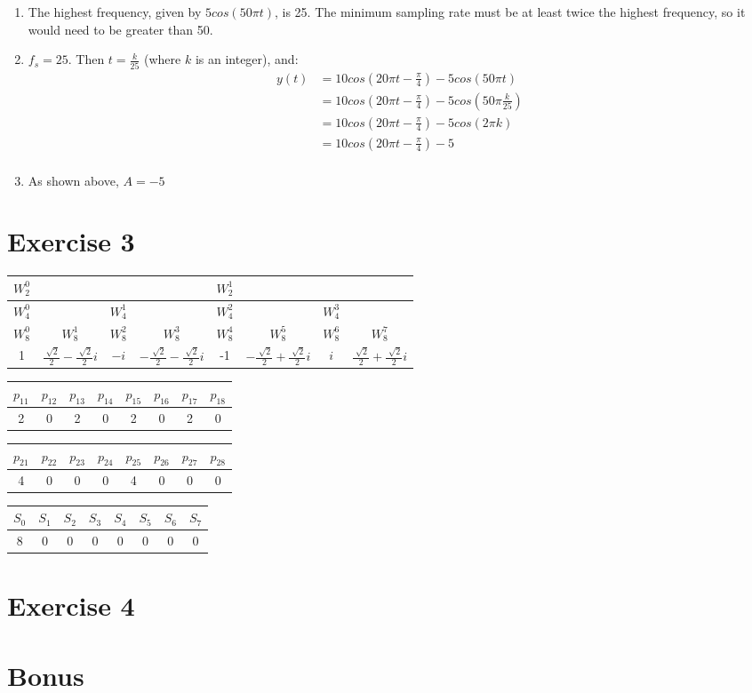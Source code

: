 \documentclass[12pt]{article}
\begin{document}
\begin{enumerate}[label=\alph*)]

\item The highest frequency, given by $5cos(50\pi t)$, is 25. The minimum sampling rate must be at least twice the highest frequency, so it would need to be greater than 50.

\item $f_s = 25$. Then $t = \frac{k}{25}$ (where $k$ is an integer), and:
\begin{align*}
y(t) &= 10cos(20\pi t - \frac{\pi}{4}) - 5cos(50\pi t)\\
&= 10cos(20\pi t - \frac{\pi}{4}) - 5cos(50\pi \frac{k}{25}) \\
&= 10cos(20\pi t - \frac{\pi}{4}) - 5cos(2\pi k) \\
&= 10cos(20\pi t - \frac{\pi}{4}) - 5 \\
\end{align*}

\item As shown above, $A = -5$

\end{enumerate}

\section*{Exercise 3}
\begin{tabular}{*{8}{| c }|}
\hline
$W_2^0$ & & & & $W_2^1$ & & & \\
\hline
$W_4^0$ & & $W_4^1$ & & $W_4^2$ & & $W_4^3$ & \\
\hline
$W_8^0$ & $W_8^1$ & $W_8^2$ & $W_8^3$ & $W_8^4$ & $W_8^5$ & $W_8^6$ & $W_8^7$ \\
 & $\frac{\sqrt[]{2}}{2} - \frac{\sqrt[]{2}}{2}i$ & $-i$ & $-\frac{\sqrt[]{2}}{2} - \frac{\sqrt[]{2}}{2}i$ & -1 & $-\frac{\sqrt[]{2}}{2} + \frac{\sqrt[]{2}}{2}i$ & $i$ & $\frac{\sqrt[]{2}}{2} + \frac{\sqrt[]{2}}{2}i$ \\
\hline
\end{tabular}


\begin{tabular}{*{8}{|c}|}
\hline
$p_{11}$ & $p_{12}$ & $p_{13}$ & $p_{14}$ & $p_{15}$ & $p_{16}$ & $p_{17}$ & $p_{18}$ \\
 & 0 & 2 & 0 & 2 & 0 & 2 & 0\\
\hline
\end{tabular}

\begin{tabular}{*{8}{|c}|}
\hline
$p_{21}$ & $p_{22}$ & $p_{23}$ & $p_{24}$ & $p_{25}$ & $p_{26}$ & $p_{27}$ & $p_{28}$ \\
 & 0 & 0 & 0 & 4 & 0 & 0 & 0\\
\hline
\end{tabular}

\begin{tabular}{*{8}{|c}|}
\hline
$S_0$ & $S_1$ & $S_2$ & $S_3$ & $S_4$ & $S_5$ & $S_6$ & $S_7$ \\
 & 0 & 0 & 0 & 0 & 0 & 0 & 0\\
\hline
\end{tabular}


\section*{Exercise 4}

\section*{Bonus}
\end{document}
